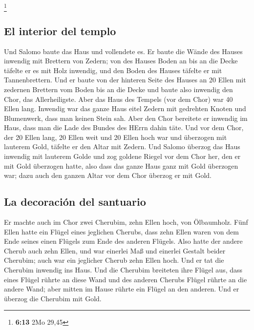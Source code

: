 \footnote{\textbf{6:13} 2Mo 29,45}

\hypertarget{el-interior-del-templo}{%
\subsection{El interior del templo}\label{el-interior-del-templo}}

 Und Salomo baute das Haus und vollendete es.
 Er baute die Wände des Hauses inwendig mit Brettern von
Zedern; von des Hauses Boden an bis an die Decke täfelte er es mit Holz
inwendig, und den Boden des Hauses täfelte er mit Tannenbrettern.
 Und er baute von der hinteren Seite des Hauses an 20
Ellen mit zedernen Brettern vom Boden bis an die Decke und baute also
inwendig den Chor, das Allerheiligste.  Aber das Haus des
Tempels (vor dem Chor) war 40 Ellen lang.  Inwendig war
das ganze Haus eitel Zedern mit gedrehten Knoten und Blumenwerk, dass
man keinen Stein sah.  Aber den Chor bereitete er
inwendig im Haus, dass man die Lade des Bundes des HErrn dahin täte.
 Und vor dem Chor, der 20 Ellen lang, 20 Ellen weit und
20 Ellen hoch war und überzogen mit lauterem Gold, täfelte er den Altar
mit Zedern.  Und Salomo überzog das Haus inwendig mit
lauterem Golde und zog goldene Riegel vor dem Chor her, den er mit Gold
überzogen hatte,  also dass das ganze Haus ganz mit Gold
überzogen war; dazu auch den ganzen Altar vor dem Chor überzog er mit
Gold.

\hypertarget{la-decoraciuxf3n-del-santuario}{%
\subsection{La decoración del
santuario}\label{la-decoraciuxf3n-del-santuario}}

 Er machte auch im Chor zwei Cherubim, zehn Ellen hoch,
von Ölbaumholz.  Fünf Ellen hatte ein Flügel eines
jeglichen Cherubs, dass zehn Ellen waren von dem Ende seines einen
Flügels zum Ende des anderen Flügels.  Also hatte der
andere Cherub auch zehn Ellen, und war einerlei Maß und einerlei Gestalt
beider Cherubim;  auch war ein jeglicher Cherub zehn
Ellen hoch.  Und er tat die Cherubim inwendig ins Haus.
Und die Cherubim breiteten ihre Flügel aus, dass eines Flügel rührte an
diese Wand und des anderen Cherubs Flügel rührte an die andere Wand;
aber mitten im Hause rührte ein Flügel an den anderen. 
Und er überzog die Cherubim mit Gold.

